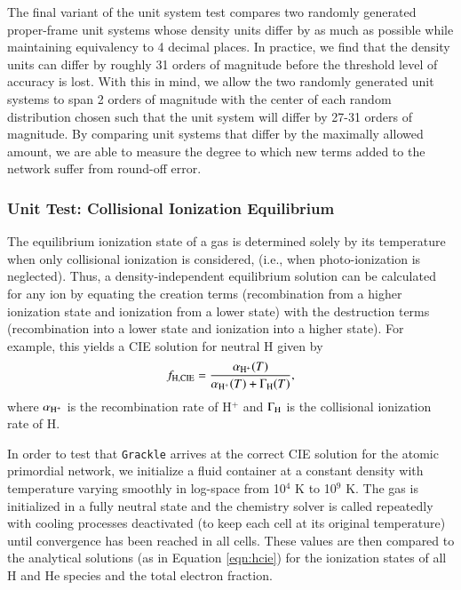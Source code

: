 The final variant of the unit system test compares two randomly
generated proper-frame unit systems whose density units differ by as
much as possible while maintaining equivalency to 4 decimal places.
In practice, we find that the density units can differ by roughly 31
orders of magnitude before the threshold level of accuracy is lost.
With this in mind, we allow the two randomly generated unit systems to
span 2 orders of magnitude with the center of each random distribution
chosen such that the unit system will differ by 27-31 orders of
magnitude.  By comparing unit systems that differ by the maximally
allowed amount, we are able to measure the degree to which new terms
added to the network suffer from round-off error.

\subsubsection{Unit Test: Collisional Ionization Equilibrium}
\label{sec:test-cie}

The equilibrium ionization state of a gas is determined solely by its
temperature when only collisional ionization is considered, (i.e.,
when photo-ionization is neglected).  Thus, a density-independent
equilibrium solution can be calculated for any ion by equating the
creation terms (recombination from a higher ionization state and 
ionization from a lower state) with the destruction terms
(recombination into a lower state and ionization into a higher
state).  For example, this yields a CIE solution for neutral H given
by
\begin{equation} \label{eqn:hcie}
f_{\rm H,CIE} = \frac{\alpha_{\rm H^{+}}(T)}{\alpha_{\rm H^{+}}(T) +
  \Gamma_{\rm H}(T)},
\end{equation}
where $\alpha_{\rm H^{+}}$ is the recombination rate of H$^{+}$ and
$\Gamma_{\rm H}$ is the collisional ionization rate of H.

In order to test that \texttt{Grackle} arrives at the correct CIE solution for
the atomic primordial network, we initialize a fluid container at a
constant density with temperature varying smoothly in log-space from
10$^{4}$ K to 10$^{9}$ K.  The gas is initialized in a fully neutral
state and the chemistry solver is called repeatedly with cooling
processes deactivated (to keep each cell at its original temperature)
until convergence has been reached in all cells.  These values are
then compared to the analytical solutions (as in Equation
\ref{eqn:hcie}) for the ionization states of all H and He species and
the total electron fraction.

